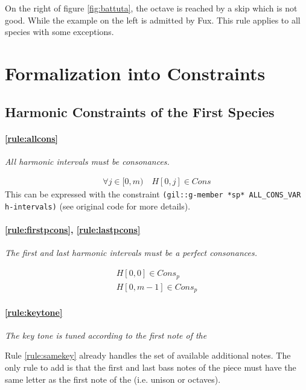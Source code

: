 \begin{enumerate}[wide, label=\bfseries 1.P\arabic*]
    On the right of figure \ref{fig:battuta}, the octave is reached by a skip which is not good. While the example on the left is admitted by Fux. This rule applies to all species with some exceptions.
\end{enumerate}

\section{Formalization into Constraints}

\subsection{Harmonic Constraints of the First Species}

\paragraph{\ref{rule:allcons}} \textit{All harmonic intervals must be consonances.}

\begin{equation}
    \begin{gathered}
        \forall j \in [0, m)\quad 
        H[0, j] \in Cons
    \end{gathered}
\end{equation}
This can be expressed with the constraint {\small\texttt{(gil::g-member *sp* ALL\_CONS\_VAR h-intervals)}} (see original code for more details).

\paragraph{\ref{rule:firstpcons}, \ref{rule:lastpcons}} \textit{The first and last harmonic intervals must be a perfect consonances.}

\begin{equation}
    \begin{gathered}
        H[0, 0] \in Cons_{p}\\
        H[0, m-1] \in Cons_{p}
    \end{gathered}
\end{equation}

\paragraph{\ref{rule:keytone}} \textit{The key tone is tuned according to the first note of the \cfdot}

Rule \ref{rule:samekey} already handles the set of available additional notes. The only rule to add is that the first and last bass notes of the piece must have the same letter as the first note of the \cf (i.e. unison or octaves).

